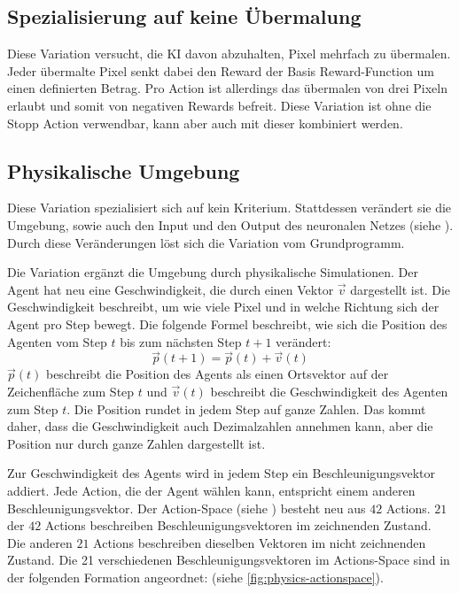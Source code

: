\subsection{Spezialisierung auf keine Übermalung}\label{sub:m_var_overdraw}
Diese Variation versucht, die KI davon abzuhalten, Pixel mehrfach zu übermalen.
Jeder übermalte Pixel senkt dabei den Reward der Basis Reward-Function um einen
definierten Betrag. Pro Action ist allerdings das übermalen von drei Pixeln
erlaubt und somit von negativen Rewards befreit. Diese Variation ist ohne
die Stopp Action verwendbar, kann aber auch mit dieser kombiniert werden.


\subsection{Physikalische Umgebung}\label{sub:m_var_phy} Diese Variation
spezialisiert sich auf kein Kriterium. Stattdessen verändert sie die Umgebung,
sowie auch den Input und den Output des neuronalen Netzes (siehe
). Durch diese Veränderungen löst sich die Variation vom
Grundprogramm.
 
Die Variation ergänzt die Umgebung durch physikalische Simulationen. Der Agent
hat neu eine Geschwindigkeit, die durch einen Vektor $\vec{v}$ dargestellt ist.
Die Geschwindigkeit beschreibt, um wie viele Pixel und in welche Richtung sich
der Agent pro Step bewegt. Die folgende Formel beschreibt, wie sich die Position
des Agenten vom Step $t$ bis zum nächsten Step $t+1$ verändert:
\[ \vec{p}(t+1) = \vec{p}(t) + \vec{v}(t) \]
$\vec{p}(t)$ beschreibt die Position des Agents als einen Ortsvektor auf der
Zeichenfläche zum Step $t$ und $\vec{v}(t)$ beschreibt die Geschwindigkeit des
Agenten zum Step $t$. Die Position rundet in jedem Step auf ganze Zahlen. Das
kommt daher, dass die Geschwindigkeit auch Dezimalzahlen annehmen kann, aber die
Position nur durch ganze Zahlen dargestellt ist.
 
Zur Geschwindigkeit des Agents wird in jedem Step ein Beschleunigungsvektor
addiert. Jede Action, die der Agent wählen kann, entspricht einem anderen
Beschleunigungsvektor. Der Action-Space (siehe )
besteht neu aus $42$ Actions. $21$ der $42$ Actions beschreiben
Beschleunigungsvektoren im zeichnenden Zustand. Die anderen $21$ Actions
beschreiben dieselben Vektoren im nicht zeichnenden Zustand. Die 21
verschiedenen Beschleunigungsvektoren im Actions-Space sind in der folgenden
Formation angeordnet: (siehe \autoref{fig:physics-actionspace}).
 
